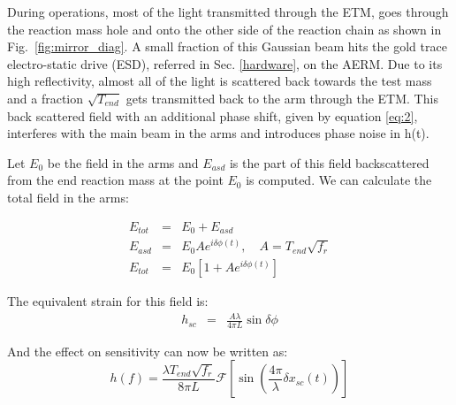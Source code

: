 \documentclass[12pt]{iopart}
\begin{document}
\par

During operations, most of the light transmitted through the ETM, goes through the reaction mass hole and onto the other side of the reaction chain as shown in Fig.~\ref{fig:mirror_diag}. A small fraction of this Gaussian beam hits the gold trace electro-static drive (ESD), referred in Sec. \ref{hardware}, on the AERM. Due to its high reflectivity, almost all of the light is scattered back towards the test mass and a fraction $\sqrt{T_{end}}$ gets transmitted back to the arm through the ETM. This back scattered field with an additional phase shift, given by equation \ref{eq:2}, interferes with the main beam in the arms and introduces phase noise in h(t).
\par
Let $E_{0}$ be the field in the arms and $E_{asd}$ is the part of this field backscattered from the end reaction mass at the point $E_{0}$ is computed. We can calculate the total field in the arms:

\begin{eqnarray}
    E_{tot} & = & E_{0} + E_{asd} \label{eq:4} \\
    E_{asd} & = & E_{0}Ae^{i{\delta}{\phi}(t)} ,\quad A = T_{end}\sqrt{f_{r}}  \label{eq:5} \\ 
    E_{tot} & = & E_{0}[1 + Ae^{i{\delta}{\phi}(t)}]  \label{eq:6}
\end{eqnarray}


The equivalent strain for this field is:
\begin{eqnarray}
     h_{sc} & = & \frac{A{\lambda}}{4{\pi}L}\sin{\delta}{\phi}  \label{eq:7}
\end{eqnarray}
   

And the effect on sensitivity can now be written as:
\begin{equation}
    h(f) = \frac{\lambda T_{end}\sqrt{f_{r}}}{8{\pi}L}\mathcal{F}\left[\sin\left(\frac{4{\pi}}{\lambda}{\delta x_{sc}(t)}\right)\right]  \label{eq:8}
\end{equation}
\end{document}
